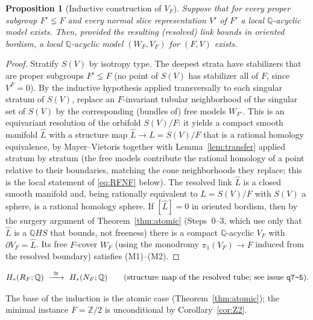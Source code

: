 \documentclass[12pt]{article}
\newtheorem{proposition}[theorem]{Proposition}
\theoremstyle{definition}
\begin{document}
\begin{proposition}[Inductive construction of $V_F$]\label{prop:induct}
Suppose that for every proper subgroup $F'\lneq F$ and every normal slice
representation $V'$ of $F'$ a local $\mathbb{Q}$-acyclic model exists.
Then, provided the resulting (resolved) link bounds in oriented bordism, a
local $\mathbb{Q}$-acyclic model $(W_F,V_F)$ for $(F,V)$ exists.
\end{proposition}
\begin{proof}
Stratify $S(V)$ by isotropy type. The deepest strata have stabilizers that are
proper subgroups $F'\lneq F$ (no point of $S(V)$ has stabilizer all of $F$,
since $V^F=0$). By the inductive hypothesis applied transversally to each
singular stratum of $S(V)$, replace an $F$-invariant tubular neighborhood of the
singular set of $S(V)$ by the corresponding (bundles of) free models $W_{F'}$.
This is an equivariant resolution of the orbifold $S(V)/F$: it yields a compact
smooth manifold $\widehat L$ with a structure map $\widehat L\to L=S(V)/F$ that
is a rational homology equivalence, by Mayer--Vietoris together with
Lemma~\ref{lem:transfer} applied stratum by stratum (the free models contribute
the rational homology of a point relative to their boundaries, matching the
cone neighborhoods they replace; this is the local statement of
\eqref{eq:RFNF} below). The resolved link $\widehat L$ is a closed smooth
manifold and, being rationally equivalent to $L=S(V)/F$ with $S(V)$ a sphere, is
a rational homology sphere. If $[\widehat L]=0$ in oriented bordism, then by the
surgery argument of Theorem~\ref{thm:atomic} (Steps~0--3, which use only that
$\widehat L$ is a $\mathbb{Q}HS$ that bounds, not freeness) there is a compact
$\mathbb{Q}$-acyclic $V_F$ with $\partial V_F=\widehat L$. Its free
$F$-cover $W_F$ (using the monodromy $\pi_1(V_F)\to F$ induced from the resolved
boundary) satisfies (M1)--(M2).
\end{proof}

\begin{equation}\label{eq:RFNF}
H_*(R_F;\mathbb{Q})\ \xrightarrow{\ \cong\ }\ H_*(N_F;\mathbb{Q})
\qquad\text{(structure map of the resolved tube; see issue \texttt{q7-5}).}
\end{equation}

The base of the induction is the atomic case (Theorem~\ref{thm:atomic}); the
minimal instance $F=\mathbb{Z}/2$ is unconditional by Corollary~\ref{cor:Z2}.
\end{document}
